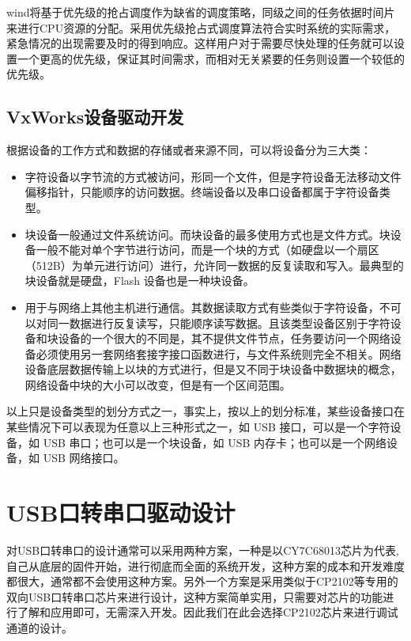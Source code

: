 	wind将基于优先级的抢占调度作为缺省的调度策略，同级之间的任务依据时间片来进行CPU资源的分配。采用优先级抢占式调度算法符合实时系统的实际需求，紧急情况的出现需要及时的得到响应。这样用户对于需要尽快处理的任务就可以设置一个更高的优先级，保证其时间需求，而相对无关紧要的任务则设置一个较低的优先级。



\subsection{VxWorks设备驱动开发}
	
	根据设备的工作方式和数据的存储或者来源不同，可以将设备分为三大类：
\begin{itemize}
\item {}

	字符设备以字节流的方式被访问，形同一个文件，但是字符设备无法移动文件偏移指针，只能顺序的访问数据。终端设备以及串口设备都属于字符设备类型。

\item {}

	块设备一般通过文件系统访问。而块设备的最多使用方式也是文件方式。块设备一般不能对单个字节进行访问，而是一个块的方式（如硬盘以一个扇区（512B）为单元进行访问）进行，允许同一数据的反复读取和写入。最典型的块设备就是硬盘，Flash 设备也是一种块设备。
	
\item {}

	用于与网络上其他主机进行通信。其数据读取方式有些类似于字符设备，不可以对同一数据进行反复读写，只能顺序读写数据。且该类型设备区别于字符设备和块设备的一个很大的不同是，其不提供文件节点，任务要访问一个网络设备必须使用另一套网络套接字接口函数进行，与文件系统则完全不相关。网络设备底层数据传输上以块的方式进行，但是又不同于块设备中数据块的概念，网络设备中块的大小可以改变，但是有一个区间范围。
	
\end{itemize}

	以上只是设备类型的划分方式之一，事实上，按以上的划分标准，某些设备接口在某些情况下可以表现为任意以上三种形式之一，如 USB 接口，可以是一个字符设备，如 USB 串口；也可以是一个块设备，如 USB 内存卡；也可以是一个网络设备，如 USB 网络接口。

\section{USB口转串口驱动设计}

	对USB口转串口的设计通常可以采用两种方案，一种是以CY7C68013芯片为代表,自己从底层的固件开始，进行彻底而全面的系统开发，这种方案的成本和开发难度都很大，通常都不会使用这种方案。另外一个方案是采用类似于CP2102等专用的双向USB口转串口芯片来进行设计，这种方案简单实用，只需要对芯片的功能进行了解和应用即可，无需深入开发。因此我们在此会选择CP2102芯片来进行调试通道的设计。


